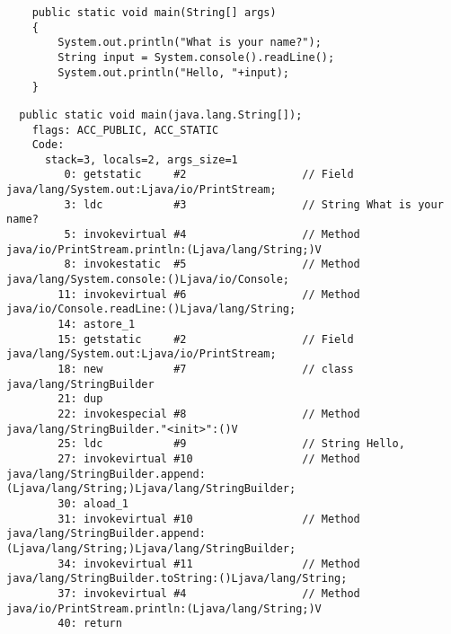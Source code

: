 \subsubsection{}


\begin{lstlisting}
	public static void main(String[] args)
	{
		System.out.println("What is your name?");
		String input = System.console().readLine();
		System.out.println("Hello, "+input);
	}
\end{lstlisting}

\begin{lstlisting}
  public static void main(java.lang.String[]);
    flags: ACC_PUBLIC, ACC_STATIC
    Code:
      stack=3, locals=2, args_size=1
         0: getstatic     #2                  // Field java/lang/System.out:Ljava/io/PrintStream;
         3: ldc           #3                  // String What is your name?
         5: invokevirtual #4                  // Method java/io/PrintStream.println:(Ljava/lang/String;)V
         8: invokestatic  #5                  // Method java/lang/System.console:()Ljava/io/Console;
        11: invokevirtual #6                  // Method java/io/Console.readLine:()Ljava/lang/String;
        14: astore_1      
        15: getstatic     #2                  // Field java/lang/System.out:Ljava/io/PrintStream;
        18: new           #7                  // class java/lang/StringBuilder
        21: dup           
        22: invokespecial #8                  // Method java/lang/StringBuilder."<init>":()V
        25: ldc           #9                  // String Hello, 
        27: invokevirtual #10                 // Method java/lang/StringBuilder.append:(Ljava/lang/String;)Ljava/lang/StringBuilder;
        30: aload_1       
        31: invokevirtual #10                 // Method java/lang/StringBuilder.append:(Ljava/lang/String;)Ljava/lang/StringBuilder;
        34: invokevirtual #11                 // Method java/lang/StringBuilder.toString:()Ljava/lang/String;
        37: invokevirtual #4                  // Method java/io/PrintStream.println:(Ljava/lang/String;)V
        40: return        
\end{lstlisting}

